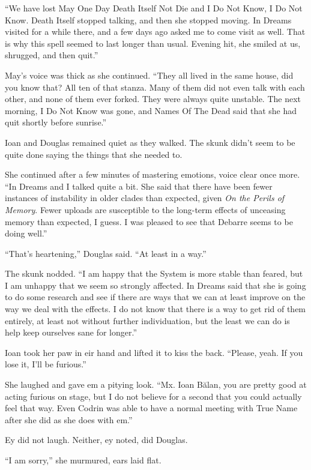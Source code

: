 ``We have lost May One Day Death Itself Not Die and I Do Not Know, I Do Not Know. Death Itself stopped talking, and then she stopped moving. In Dreams visited for a while there, and a few days ago asked me to come visit as well. That is why this spell seemed to last longer than usual. Evening hit, she smiled at us, shrugged, and then quit.''

May's voice was thick as she continued. ``They all lived in the same house, did you know that? All ten of that stanza. Many of them did not even talk with each other, and none of them ever forked. They were always quite unstable. The next morning, I Do Not Know was gone, and Names Of The Dead said that she had quit shortly before sunrise.''

Ioan and Douglas remained quiet as they walked. The skunk didn't seem to be quite done saying the things that she needed to.

She continued after a few minutes of mastering emotions, voice clear once more. ``In Dreams and I talked quite a bit. She said that there have been fewer instances of instability in older clades than expected, given \emph{On the Perils of Memory}. Fewer uploads are susceptible to the long-term effects of unceasing memory than expected, I guess. I was pleased to see that Debarre seems to be doing well.''

``That's heartening,'' Douglas said. ``At least in a way.''

The skunk nodded. ``I am happy that the System is more stable than feared, but I am unhappy that we seem so strongly affected. In Dreams said that she is going to do some research and see if there are ways that we can at least improve on the way we deal with the effects. I do not know that there is a way to get rid of them entirely, at least not without further individuation, but the least we can do is help keep ourselves sane for longer.''

Ioan took her paw in eir hand and lifted it to kiss the back. ``Please, yeah. If you lose it, I'll be furious.''

She laughed and gave em a pitying look. ``Mx. Ioan Bălan, you are pretty good at acting furious on stage, but I do not believe for a second that you could actually feel that way. Even Codrin was able to have a normal meeting with True Name after she did as she does with em.''

Ey did not laugh. Neither, ey noted, did Douglas.

``I am sorry,'' she murmured, ears laid flat.

